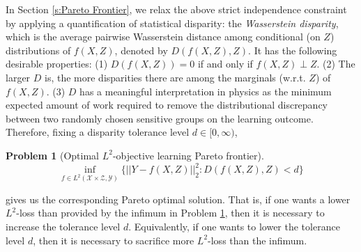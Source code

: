\documentclass[twoside,11pt]{article}
\newtheorem{prob}{Problem}
\begin{document}
In Section \ref{s:Pareto Frontier}, we relax the above strict independence constraint by applying a quantification of statistical disparity: the {\em Wasserstein disparity}, which is the average pairwise Wasserstein distance among conditional (on $Z$) distributions of $f(X,Z)$, denoted by $D(f(X,Z),Z)$. It has the following desirable properties: (1) $D(f(X,Z)) = 0$ if and only if $f(X,Z) \perp Z$. (2) The larger $D$ is, the more disparities there are among the marginals (w.r.t. $Z$) of $f(X,Z)$. (3) $D$ has a meaningful interpretation in physics as the minimum expected amount of work required to remove the distributional discrepancy between two randomly chosen sensitive groups on the learning outcome. Therefore, fixing a disparity tolerance level $d \in [0,\infty)$, \begin{prob}[Optimal $L^2$-objective learning Pareto frontier]\label{prob:Optimal $L^2$-objective Learning Pareto Frontier}
\begin{equation}
\inf_{f \in L^2(\mathcal{X} \times \mathcal{Z},\mathcal{Y})} \{||Y - f(X,Z)||_2^2 : D(f(X,Z),Z) < d\}
\end{equation}
\end{prob}
gives us the corresponding Pareto optimal solution. That is, if one wants a lower $L^2$-loss than provided by the infimum in Problem \ref{prob:Optimal $L^2$-objective Learning Pareto Frontier}, then it is necessary to increase the tolerance level $d$. Equivalently, if one wants to lower the tolerance level $d$, then it is necessary to sacrifice more $L^2$-loss than the infimum.
\end{document}
